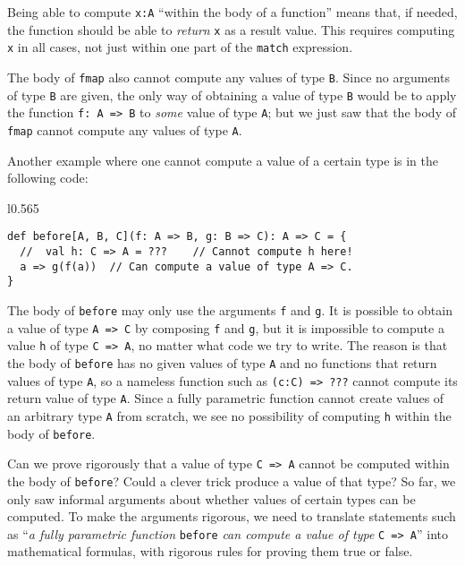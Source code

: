 Being able to compute \lstinline!x:A! ``within the body of a function''
means that, if needed, the function should be able to \emph{return}
\lstinline!x! as a result value. This requires computing \lstinline!x!
in all cases, not just within one part of the \lstinline!match! expression. 

The body of \lstinline!fmap! also cannot compute any values of type
\lstinline!B!. Since no arguments of type \lstinline!B! are given,
the only way of obtaining a value of type \lstinline!B! would be
to apply the function \lstinline!f: A => B! to \emph{some} value
of type \lstinline!A!; but we just saw that the body of \lstinline!fmap!
cannot compute any values of type \lstinline!A!.

Another example where one cannot compute a value of a certain type
is in the following code:

\begin{wrapfigure}{l}{0.565\columnwidth}%
\vspace{-0.1\baselineskip}
\begin{lstlisting}
def before[A, B, C](f: A => B, g: B => C): A => C = {
  //  val h: C => A = ???    // Cannot compute h here!
  a => g(f(a))  // Can compute a value of type A => C.
}
\end{lstlisting}

\vspace{-1.2\baselineskip}
\end{wrapfigure}%

\noindent The body of \lstinline!before! may only use the arguments
\lstinline!f! and \lstinline!g!. It is possible to obtain a value
of type \lstinline!A => C! by composing \lstinline!f! and \lstinline!g!,
but it is impossible to compute a value \lstinline!h! of type \lstinline!C => A!,
no matter what code we try to write. The reason is that the body of
\lstinline!before! has no given values of type \lstinline!A! and
no functions that return values of type \lstinline!A!, so a nameless
function such as \lstinline!(c:C) => ???! cannot compute its return
value of type \lstinline!A!. Since a fully parametric function cannot
create values of an arbitrary type \lstinline!A! from scratch, we
see no possibility of computing \lstinline!h! within the body of
\lstinline!before!.

Can we prove rigorously that a value of type \lstinline!C => A! cannot
be computed within the body of \lstinline!before!? Could a clever
trick produce a value of that type? So far, we only saw informal arguments
about whether values of certain types can be computed. To make the
arguments rigorous, we need to translate statements such as ``\emph{a
fully parametric function} \lstinline!before! \emph{can compute a
value of type} \lstinline!C => A!'' into mathematical formulas,
with rigorous rules for proving them true or false.

